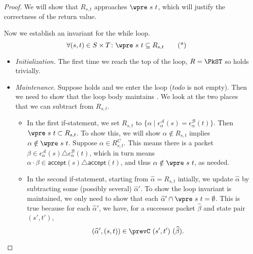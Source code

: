 \documentclass[acmsmall,dvipsnames,nonacm]{acmart}
\newcommand\todoR{\textit{todo}}
\newcommand\sympk{\widehat\alpha}
\newcommand\sympkp{\widehat\beta}
\newcommand\pk{\alpha}
\newcommand\pkp{\beta}
\newcommand\accept{\mathsf{accept}}
\newcommand\A{\mathcal{A}}
\newcommand\B{\mathcal{B}}
\newcommand\epsA{\epsilon^\A_\pk}
\newcommand\epsB{\epsilon^\B_\pk}
\begin{document}
\wpcorrectness*
\begin{proof}
We will show that $R_{s,t}$ approaches $\wpre\ s\ t$, which will justify the
correctness of the return value.

Now we establish an invariant for the while loop.
\[ \forall (s,t)\in S\times T\colon \wpre\ s\ t \subseteq R_{s,t} \tag{*}\label{wp-i1}\]
\begin{itemize}
    \item \emph{Initialization.} The first time we reach the top of the loop,
        $R = \PkST$ so  holds trivially.
    \item \emph{Maintenance.} Suppose  holds and we enter the loop
        ($\todoR$ is not empty). Then we need to show that the loop body
        maintains . We look at the two places that we can subtract
        from $R_{s,t}$.
        \begin{itemize}
            \item In the first if-statement, we set $R_{s,t}$ to $\{\pk \mid
                \epsA(s) = \epsB(t)\}$. Then $\wpre\ s\ t \subset R_{s,t}$. To
                show this, we will show $\pk \notin R_{s,t}$ implies $\pk \notin
                \wpre\ s\ t$.
                Suppose $\pk \in R_{s,t}^C$. This means there is a packet $\pkp \in
                \epsA(s) \triangle \epsB(t)$, which in turn means $\pk\cdot\pkp \in
                \accept(s) \triangle \accept(t)$, and thus $\pk\notin \wpre\ s\
                t$, as needed.
            \item In the second if-statement, starting from $\sympk = R_{s,t}$
                intially, we update $\sympk$
                by subtracting some (possibly several) $\sympk'$.
                To show the loop invariant is maintained, we only
                need to show that each $\sympk' \cap \wpre\ s\ t = \emptyset$. This is
                true because for each $\sympk'$, we have, for a successor packet
                $\sympkp$ and state pair $(s',t')$,
                \[(\sympk',(s,t)) \in \prevC\ (s',t')\ (\sympkp). \]


\end{itemize}
\end{itemize}
\end{proof}
\end{document}
